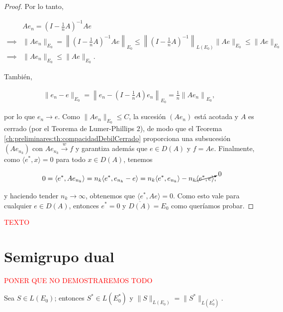 \begin{proof}
    Por lo tanto, 

    \begin{align*}
        &Ae_n = \left(I - \frac{1}{n}A\right)^{-1}Ae\\
        \implies& \lVert Ae_n \rVert_{E_0} = \left \lVert \left(I - \frac{1}{n}A\right)^{-1}Ae\right \rVert_{E_0} \leq \left \lVert \left(I - \frac{1}{n}A\right)^{-1}\right \rVert_{L(E_0)} \lVert Ae \rVert_{E_0} \leq \lVert Ae \rVert_{E_0}\\
        \implies& \lVert Ae_n \rVert_{E_0} \leq \lVert Ae \rVert_{E_0}.
    \end{align*}

    También,

    \begin{align*}
        \lVert e_n - e\rVert_{E_0} = \left \lVert e_n - \left(I - \frac{1}{n}A\right)e_n \right \rVert_{E_0} = \frac{1}{n}\left \lVert Ae_n \right \rVert_{E_0},
    \end{align*}

    por lo que $e_n \rightarrow e$. Como $\lVert Ae_n \rVert_{E_0} \leq C$, la sucesión $(Ae_n)$ está acotada y $A$ es cerrado (por el Teorema de Lumer-Phillips $2$), de modo que el Teorema \ref{ch:preliminares:th:compacidadDebilCerrado} proporciona una subsucesión $(Ae_{n_k})$ con $Ae_{n_k} \xrightarrow{w} f$ y garantiza además que $e \in D(A)$ y $f = Ae$. Finalmente, como $\langle e^*, x \rangle = 0$ para todo $x \in D(A)$, tenemos

    \[0 = \langle e^*, Ae_{n_k}\rangle = n_k \langle e^*, e_{n_k} - e \rangle = n_k \langle e^*, e_{n_k}\rangle - n_k \cancelto{0}{\langle e^*, e\rangle},\]

    y haciendo tender $n_k \rightarrow \infty$, obtenemos que $\langle e^*, Ae\rangle = 0$. Como esto vale para cualquier $e \in D(A)$, entonces $e^* = 0$ y $\overline{D(A)} = E_0$ como queríamos probar.
\end{proof}

\textcolor{red}{TEXTO}

\section{Semigrupo dual}
\label{ch:semigrupos:section:dual}

\textcolor{red}{PONER QUE NO DEMOSTRAREMOS TODO}\\

\begin{Lema}
    \label{ch:semigrupos:section:dual:lema:adjuntoLema}

    Sea $S \in L(E_0)$; entonces $S^* \in L(E_0^*)$ y $\lVert S \rVert_{L(E_0)} = \lVert S^* \rVert_{L(E_0^*)}$.
\end{Lema}

